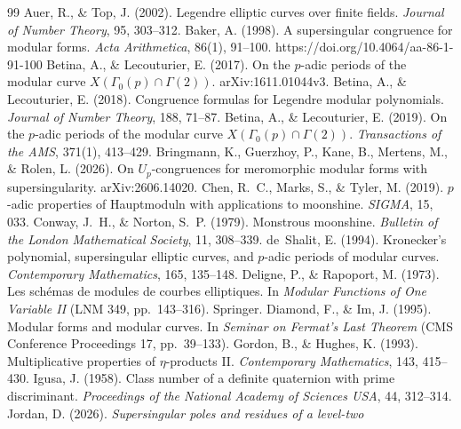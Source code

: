 \documentclass[11pt,a4paper]{article}
\numberwithin{equation}{section}
\theoremstyle{definition}
\theoremstyle{remark}
\begin{document}
\begin{thebibliography}{99}\small
{} Auer, R., \& Top, J. (2002). Legendre elliptic curves over finite fields.
\emph{Journal of Number Theory}, 95, 303--312.
 Baker, A. (1998). A supersingular congruence for modular forms.
\emph{Acta Arithmetica}, 86(1), 91--100. https://doi.org/10.4064/aa-86-1-91-100
 Betina, A., \& Lecouturier, E. (2017). On the $p$-adic periods of
the modular curve $X(\Gamma_0(p)\cap\Gamma(2))$. arXiv:1611.01044v3.
 Betina, A., \& Lecouturier, E. (2018). Congruence formulas for
Legendre modular polynomials. \emph{Journal of Number Theory}, 188, 71--87.
 Betina, A., \& Lecouturier, E. (2019). On the $p$-adic periods of
the modular curve $X(\Gamma_0(p)\cap\Gamma(2))$. \emph{Transactions of the AMS}, 371(1), 413--429.
 Bringmann, K., Guerzhoy, P., Kane, B., Mertens, M., \& Rolen, L.
(2026). On $U_p$-congruences for meromorphic modular forms with supersingularity. arXiv:2606.14020.
 Chen, R.~C., Marks, S., \& Tyler, M. (2019). $p$-adic properties of
Hauptmoduln with applications to moonshine. \emph{SIGMA}, 15, 033.
 Conway, J.~H., \& Norton, S.~P. (1979). Monstrous moonshine.
\emph{Bulletin of the London Mathematical Society}, 11, 308--339.
 de~Shalit, E. (1994). Kronecker's polynomial, supersingular elliptic curves,
and $p$-adic periods of modular curves. \emph{Contemporary Mathematics}, 165, 135--148.
 Deligne, P., \& Rapoport, M. (1973). Les sch\'emas de modules de
courbes elliptiques. In \emph{Modular Functions of One Variable II} (LNM 349, pp.~143--316). Springer.
 Diamond, F., \& Im, J. (1995). Modular forms and modular curves.
In \emph{Seminar on Fermat's Last Theorem} (CMS Conference Proceedings 17, pp.~39--133).
 Gordon, B., \& Hughes, K. (1993). Multiplicative properties of
$\eta$-products II. \emph{Contemporary Mathematics}, 143, 415--430.
 Igusa, J. (1958). Class number of a definite quaternion with prime
discriminant. \emph{Proceedings of the National Academy of Sciences USA}, 44, 312--314.
 Jordan, D. (2026). \emph{Supersingular poles and residues of a level-two
}
\end{thebibliography}
\end{document}
